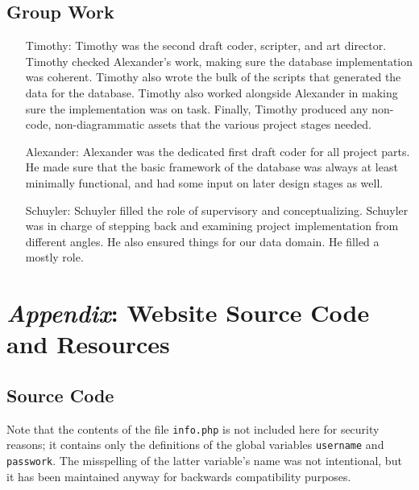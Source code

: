 \documentclass[american,extrafontsizes,12pt,portrait,letterpaper,oneside,onecolumn,final]{memoir}
\begin{document}
\section{Group Work}
\begin{samepage}%
\begin{enumerate}[leftmargin=*,widest={Alexander:}]

\item[Timothy:]
Timothy was the second draft coder, scripter, and art director.
Timothy checked Alexander's work, making sure the database implementation was coherent.
Timothy also wrote the bulk of the scripts that generated the data for the database.
Timothy also worked alongside Alexander in making sure the implementation was on task.
Finally, Timothy produced any non\hyp code, non\hyp diagrammatic assets that the various project stages needed.

\item[Alexander:]
Alexander was the dedicated first draft coder for all project parts.
He made sure that the basic framework of the database was always at least minimally functional, and had some input on later design stages as well.

\item[Schuyler:]
Schuyler filled the role of supervisory and conceptualizing.
Schuyler was in charge of stepping back and examining project implementation from different angles.
He also ensured things  for our data domain.
He filled a mostly  role.

\end{enumerate}%
\end{samepage}

\chapter{\emph{Appendix}: Website Source Code and Resources}

\section{Source Code}

Note that the contents of the file \texttt{info.php} is not included here for security reasons; it contains only the definitions of the global variables \texttt{username} and \texttt{passwork}.
The misspelling of the latter variable's name was not intentional, but it has been maintained anyway for backwards compatibility purposes.
\end{document}
